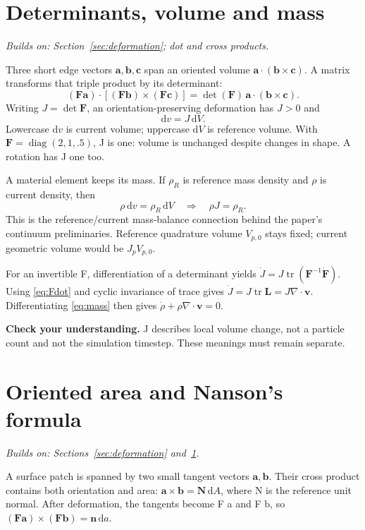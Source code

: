 \documentclass[11pt,a4paper]{article}
\newcommand{\mat}[1]{\mathbf{#1}}
\newcommand{\prereq}[1]{\textit{Builds on: #1}\par}
\newcommand{\checkpoint}[1]{\par\textbf{Check your understanding.} #1\par}
\DeclareMathOperator{\tr}{tr}
\DeclareMathOperator{\diag}{diag}
\numberwithin{equation}{section}
\begin{document}
\section{Determinants, volume and mass}\label{sec:volume}
\prereq{Section~\ref{sec:deformation}; dot and cross products.}
Three short edge vectors $\mat a,\mat b,\mat c$ span an oriented volume
$\mat a\cdot(\mat b\times\mat c)$. A matrix transforms that triple product by
its determinant:
\[
(\mat F\mat a)\cdot[(\mat F\mat b)\times(\mat F\mat c)]
=\det(\mat F)\,\mat a\cdot(\mat b\times\mat c).
\]
Writing $J=\det\mat F$, an orientation-preserving deformation has $J>0$ and
\begin{equation}\label{eq:volume}
\mathrm dv=J\,\mathrm dV.
\end{equation}
Lowercase $\mathrm dv$ is current volume; uppercase $\mathrm dV$ is reference
volume. With $\mat F=\diag(2,1,.5)$, J is one: volume is unchanged despite
changes in shape. A rotation has J one too.

A material element keeps its mass. If $\rho_R$ is reference mass density and
$\rho$ is current density, then
\begin{equation}\label{eq:mass}
\rho\,\mathrm dv=\rho_R\,\mathrm dV
\quad\Longrightarrow\quad \rho J=\rho_R.
\end{equation}
This is the reference/current mass-balance connection behind the paper's
continuum preliminaries. Reference quadrature volume $V_{p,0}$ stays fixed;
current geometric volume would be $J_pV_{p,0}$.

For an invertible F, differentiation of a determinant yields
$\dot J=J\tr(\mat F^{-1}\dot{\mat F})$.
Using \eqref{eq:Fdot} and cyclic invariance of trace gives
$\dot J=J\tr\mat L=J\nabla\cdot\mat v$.
Differentiating \eqref{eq:mass} then gives
$\dot\rho+\rho\nabla\cdot\mat v=0$.
\checkpoint{J describes local volume change, not a particle count and not the
simulation timestep. These meanings must remain separate.}

\section{Oriented area and Nanson's formula}\label{sec:nanson}
\prereq{Sections~\ref{sec:deformation} and~\ref{sec:volume}.}
A surface patch is spanned by two small tangent vectors $\mat a,\mat b$.
Their cross product contains both orientation and area:
$\mat a\times\mat b=\mat N\,\mathrm dA$, where N is the reference unit normal.
After deformation, the tangents become F a and F b, so
$(\mat F\mat a)\times(\mat F\mat b)=\mat n\,\mathrm da$.
\end{document}
